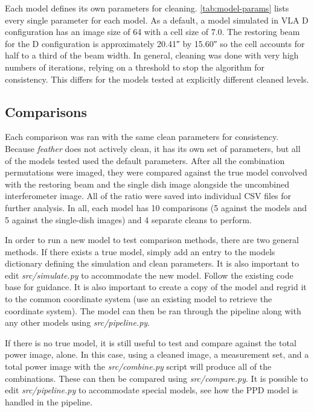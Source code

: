\documentclass[manuscript,linenumbers]{aastex62}
\begin{document}
Each model defines its own parameters for cleaning. \autoref{tab:model-params} lists every single parameter for each model. As a default, a model simulated in VLA D configuration has an image size of \num{64} with a cell size of \SI{7.0}{\arcsec}. The restoring beam for the D configuration is approximately \ang{;;20.41} by \ang{;;15.60} so the cell accounts for half to a third of the beam width. In general, cleaning was done with very high numbers of iterations, relying on a threshold to stop the algorithm for consistency. This differs for the models tested at explicitly different cleaned levels.



\subsection{Comparisons}
Each comparison was ran with the same clean parameters for consistency. Because \textit{feather} does not actively clean, it has its own set of parameters, but all of the models tested used the default parameters. After all the combination permutations were imaged, they were compared against the true model convolved with the restoring beam and the single dish image alongside the uncombined interferometer image. All of the ratio were saved into individual CSV files for further analysis. In all, each model has 10 comparisons (5 against the models and 5 against the single-dish images) and 4 separate cleans to perform. 

In order to run a new model to test comparison methods, there are two general methods. If there exists a true model, simply add an entry to the models dictionary defining the simulation and clean parameters. It is also important to edit \textit{src/simulate.py} to accommodate the new model. Follow the existing code base for guidance. It is also important to create a copy of the model and regrid it to the common coordinate system (use an existing model to retrieve the coordinate system). The model can then be ran through the pipeline along with any other models using \textit{src/pipeline.py}.

If there is no true model, it is still useful to test and compare against the total power image, alone. In this case, using a cleaned image, a measurement set, and a total power image with the \textit{src/combine.py} script will produce all of the combinations. These can then be compared using \textit{src/compare.py}. It is possible to edit \textit{src/pipeline.py} to accommodate special models, see how the PPD model is handled in the pipeline. 
\end{document}
